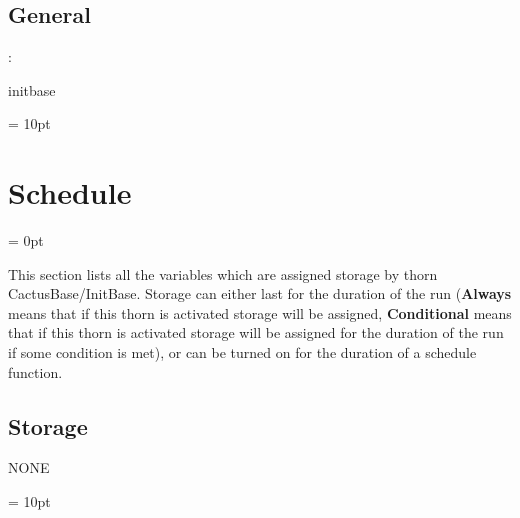 \vspace{3mm} \subsection*{General}

: 

initbase
\vspace{2mm}

\vspace{5mm}\parskip = 10pt 

\section{Schedule} 


\parskip = 0pt


\noindent This section lists all the variables which are assigned storage by thorn CactusBase/InitBase.  Storage can either last for the duration of the run ({\bf Always} means that if this thorn is activated storage will be assigned, {\bf Conditional} means that if this thorn is activated storage will be assigned for the duration of the run if some condition is met), or can be turned on for the duration of a schedule function.


\subsection*{Storage}NONE

\vspace{5mm}\parskip = 10pt 

